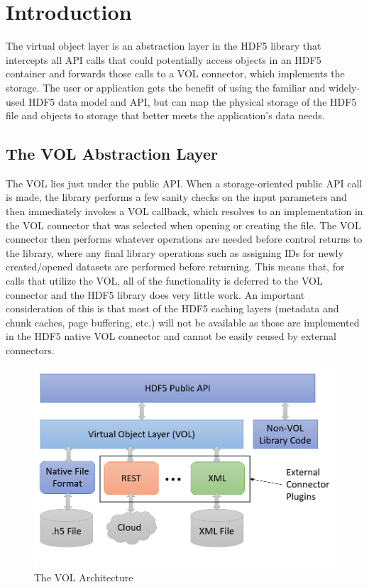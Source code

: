 

\section{Introduction}

The virtual object layer is an abstraction layer in the HDF5 library that intercepts all API calls that could potentially access objects in an HDF5 container and forwards those calls to a VOL connector, which implements the storage. The user or application gets the benefit of using the familiar and widely-used HDF5 data model and API, but can map the physical storage of the HDF5 file and objects to storage that better meets the application's data needs.

\subsection{The VOL Abstraction Layer}

The VOL lies just under the public API. When a storage-oriented public API call is made, the library performs a few sanity checks on the input parameters and then immediately invokes a VOL callback, which resolves to an implementation in the VOL connector that was selected when opening or creating the file. The VOL connector then performs whatever operations are needed before control returns to the library, where any final library operations such as assigning IDs for newly created/opened datasets are performed before returning. This means that, for calls that utilize the VOL, all of the functionality is deferred to the VOL connector and the HDF5 library does very little work. An important consideration of this is that most of the HDF5 caching layers (metadata and chunk caches, page buffering, etc.) will not be available as those are implemented in the HDF5 native VOL connector and cannot be easily reused by external connectors.

\begin{figure}[h]
\caption {The VOL Architecture}
\includegraphics[width=\textwidth]{vol_architecture.png}
\end{figure}

